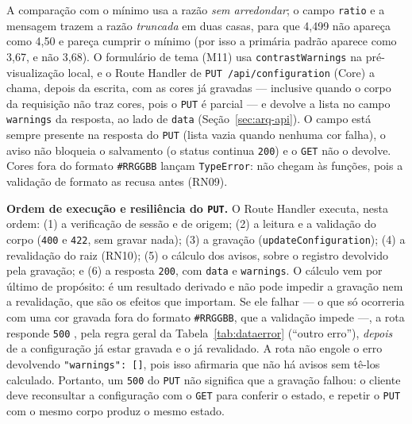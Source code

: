 A comparação com o mínimo usa a razão \emph{sem arredondar}; o campo \texttt{ratio} e a mensagem trazem a razão \emph{truncada} em duas casas, para que 4,499 não apareça como 4,50 e pareça cumprir o mínimo (por isso a primária padrão aparece como 3,67, e não 3,68). O formulário de tema (M11) usa \texttt{contrastWarnings} na pré-visualização local, e o Route Handler de \texttt{PUT /api/configuration} (Core) a chama, depois da escrita, com as cores já gravadas --- inclusive quando o corpo da requisição não traz cores, pois o \texttt{PUT} é parcial --- e devolve a lista no campo \texttt{warnings} da resposta, ao lado de \texttt{data} (Seção~\ref{sec:arq-api}). O campo está sempre presente na resposta do \texttt{PUT} (lista vazia quando nenhuma cor falha), o aviso não bloqueia o salvamento (o status continua \texttt{200}) e o \texttt{GET} não o devolve. Cores fora do formato \texttt{\#RRGGBB} lançam \texttt{TypeError}: não chegam às funções, pois a validação de formato as recusa antes (RN09).

\textbf{Ordem de execução e resiliência do \texttt{PUT}.} O Route Handler executa, nesta ordem: (1) a verificação de sessão e de origem; (2) a leitura e a validação do corpo (\texttt{400} e \texttt{422}, sem gravar nada); (3) a gravação (\texttt{updateConfiguration}); (4) a revalidação do  raiz (RN10); (5) o cálculo dos avisos, sobre o registro devolvido pela gravação; e (6) a resposta \texttt{200}, com \texttt{data} e \texttt{warnings}. O cálculo vem por último de propósito: é um resultado derivado e não pode impedir a gravação nem a revalidação, que são os efeitos que importam. Se ele falhar --- o que só ocorreria com uma cor gravada fora do formato \texttt{\#RRGGBB}, que a validação impede ---, a rota responde \texttt{500} , pela regra geral da Tabela~\ref{tab:dataerror} (``outro erro''), \emph{depois} de a configuração já estar gravada e o  já revalidado. A rota não engole o erro devolvendo \texttt{"warnings": []}, pois isso afirmaria que não há avisos sem tê-los calculado. Portanto, um \texttt{500} do \texttt{PUT} não significa que a gravação falhou: o cliente deve reconsultar a configuração com o \texttt{GET} para conferir o estado, e repetir o \texttt{PUT} com o mesmo corpo produz o mesmo estado.

